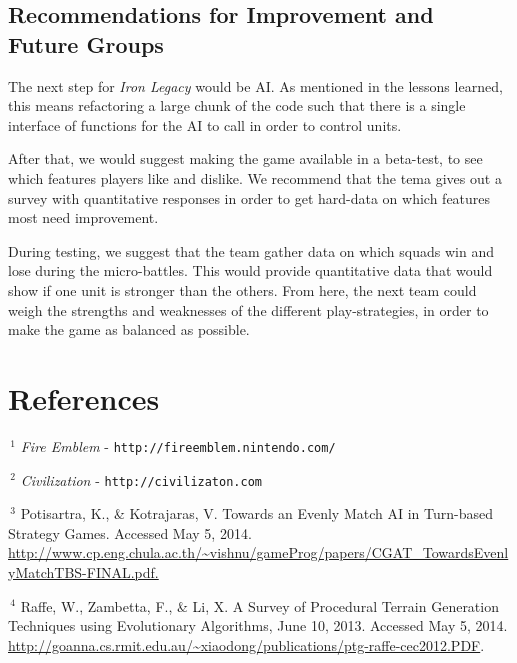 \documentclass{article}
\begin{document}
\subsection*{Recommendations for Improvement and Future Groups}

The next step for \emph{Iron Legacy} would be AI.
    As mentioned in the lessons learned, this means refactoring a large
    chunk of the code such that there is a single interface
    of functions for the AI to call in order to control units.

After that, we would suggest making the game available in a beta-test,
    to see which features players like and dislike.
    We recommend that the tema gives out a survey with quantitative
    responses in order to get hard-data on which features most need
    improvement.

During testing, we suggest that the team gather data on which squads
    win and lose during the micro-battles.
    This would provide quantitative data that would show if one unit
    is stronger than the others.
    From here, the next team could weigh the strengths and
    weaknesses of the different play-strategies, in order to make
    the game as balanced as possible.


\section*{References}

\noindent
$\,^1$
\emph{Fire Emblem} - {\tt http://fireemblem.nintendo.com/}

\vspace{.3em}

\noindent
$\,^2$
\emph{Civilization} - {\tt http://civilizaton.com}

\vspace{.3em}

\noindent
\hangindent=1cm
$\,^3$
Potisartra, K., \& Kotrajaras, V. Towards an Evenly Match AI in Turn-based Strategy Games. Accessed May 5, 2014. \url{http://www.cp.eng.chula.ac.th/~vishnu/gameProg/papers/CGAT_TowardsEvenlyMatchTBS-FINAL.pdf.}

\vspace{.3em}

\noindent
\hangindent=1cm
$\,^4$
Raffe, W., Zambetta, F., \& Li, X. A Survey of Procedural Terrain Generation Techniques using Evolutionary Algorithms, June 10, 2013. Accessed May 5, 2014. \url{http://goanna.cs.rmit.edu.au/~xiaodong/publications/ptg-raffe-cec2012.PDF}.
\end{document}
